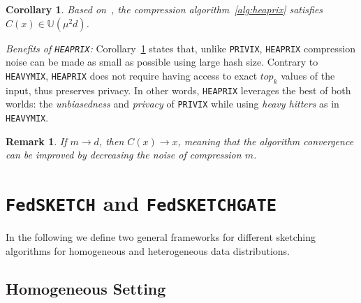 \documentclass[twoside]{article}
\newtheorem{remark}{Remark}
\newtheorem{corollary}{Corollary}
\begin{document}
\begin{corollary}\label{cor:small}
Based on~\cite[Theorem 3]{horvath2020better}, the compression algorithm~\ref{alg:heaprix} satisfies $C(x)\in \mathbb{U}(\mu^2 d)$. 
\end{corollary}
\textit{Benefits of \texttt{HEAPRIX}:} Corollary~\ref{cor:small} states that, unlike \texttt{PRIVIX}, \texttt{HEAPRIX} compression noise can be made as small as possible using large hash size. 
Contrary to \texttt{HEAVYMIX}, \texttt{HEAPRIX} does not require having access to exact $top_k$ values of the input, thus preserves privacy. 
In other words, \texttt{HEAPRIX} leverages the best of both worlds: the \emph{unbiasedness} and \emph{privacy} of \texttt{PRIVIX} while using \emph{heavy hitters} as in \texttt{HEAVYMIX}.


\begin{remark}
If $m\rightarrow d$, then $C(x)\rightarrow x$, meaning that the algorithm convergence can be improved by decreasing the noise of compression $m$. 
\end{remark}

\vspace{-0.05in}
\section{\texttt{FedSKETCH} and \texttt{FedSKETCHGATE}}\label{sec:algos}
\vspace{-0.05in}
In the following we define two general frameworks for different sketching algorithms for homogeneous and heterogeneous data distributions.
\vspace{-0.05in}
\subsection{Homogeneous Setting}
\vspace{-0.05in}
\end{document}
